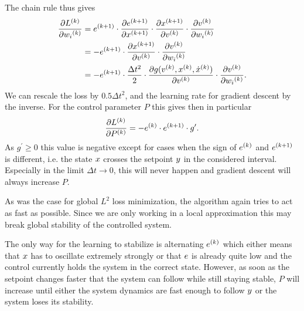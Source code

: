 \documentclass{article}
\begin{document}
    The chain rule thus gives
    \begin{align}
        \frac{\partial {L}^{(k)}}{\partial {w_i}^{(k)}} &= {e}^{(k+1)} \cdot \frac{\partial {e}^{(k+1)}}{\partial {x}^{(k+1)}} 
                                                             \cdot \frac{\partial {x}^{(k+1)}}{\partial {v}^{(k)}} 
                                                             \cdot \frac{\partial {v}^{(k)}}{\partial {w_i}^{(k)}} \nonumber \\
         &= -{e}^{(k+1)} \cdot \frac{\partial {x}^{(k+1)}}{\partial {v}^{(k)}} 
                               \cdot \frac{\partial {v}^{(k)}}{\partial {w_i}^{(k)}} \label{eq:discrete_gradient} \\
                        &= -{e}^{(k+1)} \cdot \frac{\Delta t^2}{2} 
                                              \cdot \frac{\partial g({v}^{(k)}, {x}^{(k)}, {\dot{x}}^{(k)})}{\partial {v}^{(k)}} 
                                              \cdot \frac{\partial {v}^{(k)}}{\partial {w_i}^{(k)}}.
    \end{align}
    We can rescale the loss by $0.5 \Delta t^2$, and the learning rate for gradient descent by the inverse. 
    For the control parameter $P$ this gives then in particular
    \begin{align}
        \frac{\partial {L}^{(k)}}{\partial {P}^{(k)}} = - {e}^{(k)} \cdot {e}^{(k+1)} \cdot g^\prime. \label{eq:diverging_p_local}
    \end{align}
    As $g^\prime \geq 0$ this value is negative except for cases when the sign of 
    ${e}^{(k)}$ and ${e}^{(k+1)}$ is different, 
    i.e. the state $x$ crosses the setpoint $y$ in the considered interval. 
    Especially in the limit $\Delta t \rightarrow 0$, this will never happen and gradient descent will 
    always increase $P$.

    As was the case for global $L^2$ loss minimization, the algorithm again tries to act as fast as possible. 
    Since we are only working in a local approximation this may break global stability of the controlled
    system.

    The only way for the learning to stabilize is alternating ${e}^{(k)}$ which either means
    that $x$ has to oscillate extremely strongly or that $e$ is already quite low and 
    the control currently holds the system in the correct state. However, as soon as the setpoint 
    changes faster that the system can follow while still staying stable, $P$ will increase until
    either the system dynamics are fast enough to follow $y$ or the system loses its stability.
\end{document}
